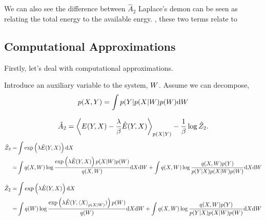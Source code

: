 \documentclass[]{article}
\begin{document}
We can also see the difference between \(\hat{A}_2\) Laplace's demon can
be seen as relating the total energy to the available enrgy. , these two
terms relate to

\subsection{Computational
Approximations}\label{computational-approximations}

Firstly, let's deal with computational approximations.

Introduce an auxiliary variable to the system, \(W\).
Assume we can decompose, 
\[
p(X, Y) = \int p(Y| p(X | W) p(W) \text{d} W
\]

\[
\hat{A}_2 = \left\langle E(Y , X) - \frac{\lambda}{\beta}\hat{E}(Y, X) \right\rangle_{p(X | Y)} - \frac{1}{\beta} \log \hat{Z}_2.
\] 
\begin{align*}
\hat{Z}_2 = & \int \exp\left(\lambda\hat{E}(Y, X)\right) \text{d}X\\
= & \int q(X, W) \log \frac{\exp\left(\lambda\hat{E}(Y, X)\right)p(X|W) p(W)}{q(X, W)} \text{d}X \text{d}W+ \int q(X, W) \log \frac{q(X, W)p(Y)}{p(Y|X)p(X | W)p(W)} \text{d}X \text{d}W
\end{align*}

\begin{align*}
\hat{Z}_2 = & \int \exp\left(\lambda\hat{E}(Y, X)\right) \text{d}X\\
= & \int q(W) \log \frac{\exp\left(\lambda\hat{E}(Y, \left\langle X \right\rangle_{p(X|W)})\right)p(W)}{q(W)} \text{d}X \text{d}W+ \int q(X, W) \log \frac{q(X, W)p(Y)}{p(Y|X)p(X | W)p(W)} \text{d}X \text{d}W
\end{align*}
\end{document}
